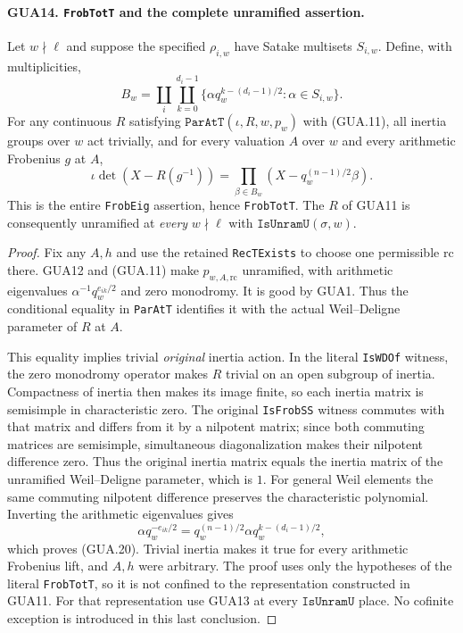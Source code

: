 \paragraph{GUA14. \texttt{FrobTotT} and the complete unramified assertion.}
\label{claim:GUA14}
Let $w\nmid\ell$ and suppose the specified
$\rho_{i,w}$ have Satake multisets $S_{i,w}$.
Define, with multiplicities,
\[
 B_w=\coprod_i\coprod_{k=0}^{d_i-1}
       \{\alpha q_w^{k-(d_i-1)/2}:\alpha\in S_{i,w}\}.
                                                        \tag{GUA.19}
\]
For any continuous $R$ satisfying
$\texttt{ParAtT}(\iota,R,w,p_w)$ with (GUA.11),
all inertia groups over $w$ act trivially, and for
every valuation $A$ over $w$ and every arithmetic
Frobenius $g$ at $A$,
\[
 \iota\det(X-R(g^{-1}))
   =\prod_{\beta\in B_w}(X-q_w^{(n-1)/2}\beta).
                                                        \tag{GUA.20}
\]
This is the entire \texttt{FrobEig} assertion, hence
\texttt{FrobTotT}.  The $R$ of GUA11 is consequently
unramified at \emph{every} $w\nmid\ell$ with
$\texttt{IsUnramU}(\sigma,w)$.
\begin{proof}
Fix any $A,h$ and use the retained \texttt{RecTExists}
to choose one permissible $\mathrm{rc}$ there.  GUA12
and (GUA.11) make $p_{w,A,\mathrm{rc}}$ unramified,
with arithmetic eigenvalues
$\alpha^{-1}q_w^{e_{ik}/2}$ and zero monodromy.
It is good by GUA1.  Thus the conditional equality
in \texttt{ParAtT} identifies it with the actual
Weil--Deligne parameter of $R$ at $A$.

This equality implies trivial \emph{original} inertia
action.  In the literal \texttt{IsWDOf} witness, the
zero monodromy operator makes $R$ trivial on an open
subgroup of inertia.  Compactness of inertia then
makes its image finite, so each inertia matrix is
semisimple in characteristic zero.  The original
\texttt{IsFrobSS} witness commutes with that matrix
and differs from it by a nilpotent matrix; since
both commuting matrices are semisimple, simultaneous
diagonalization makes their nilpotent difference zero.
Thus the original inertia matrix equals the inertia
matrix of the unramified Weil--Deligne parameter,
which is $1$.  For general Weil elements the same
commuting nilpotent difference preserves the
characteristic polynomial.
Inverting the arithmetic eigenvalues gives
\[
 \alpha q_w^{-e_{ik}/2}
    =q_w^{(n-1)/2}\alpha q_w^{k-(d_i-1)/2},
\]
which proves (GUA.20).  Trivial inertia makes it true
for every arithmetic Frobenius lift, and $A,h$ were
arbitrary.  The proof uses only the hypotheses of
the literal \texttt{FrobTotT}, so it is not confined
to the representation constructed in GUA11.
For that representation use GUA13 at every
$\texttt{IsUnramU}$ place.  No cofinite exception
is introduced in this last conclusion.
\end{proof}

